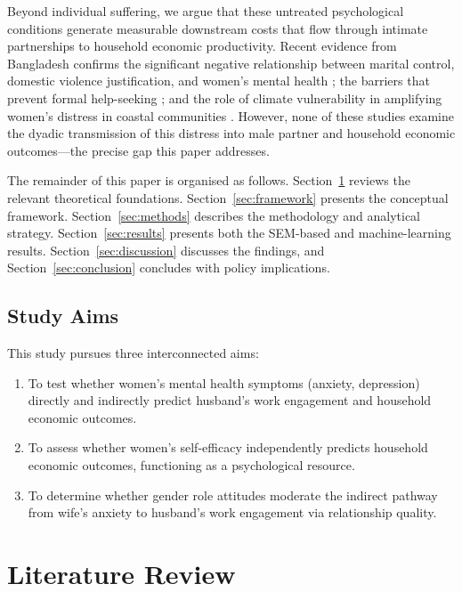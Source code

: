 \documentclass[12pt, a4paper]{article}
\begin{document}
Beyond individual suffering, we argue that these untreated psychological conditions generate measurable downstream costs that flow through intimate partnerships to household economic productivity. Recent evidence from Bangladesh confirms the significant negative relationship between marital control, domestic violence justification, and women's mental health \citep{islam2025}; the barriers that prevent formal help-seeking \citep{akter2025}; and the role of climate vulnerability in amplifying women's distress in coastal communities \citep{hossain2024}. However, none of these studies examine the dyadic transmission of this distress into male partner and household economic outcomes—the precise gap this paper addresses.

The remainder of this paper is organised as follows. Section~\ref{sec:literature} reviews the relevant theoretical foundations. Section~\ref{sec:framework} presents the conceptual framework. Section~\ref{sec:methods} describes the methodology and analytical strategy. Section~\ref{sec:results} presents both the SEM-based and machine-learning results. Section~\ref{sec:discussion} discusses the findings, and Section~\ref{sec:conclusion} concludes with policy implications.

\subsection{Study Aims}

This study pursues three interconnected aims:
\begin{enumerate}[leftmargin=2em]
  \item To test whether women's mental health symptoms (anxiety, depression) directly and indirectly predict husband's work engagement and household economic outcomes.
  \item To assess whether women's self-efficacy independently predicts household economic outcomes, functioning as a psychological resource.
  \item To determine whether gender role attitudes moderate the indirect pathway from wife's anxiety to husband's work engagement via relationship quality.
\end{enumerate}


\section{Literature Review}\label{sec:literature}
\end{document}
